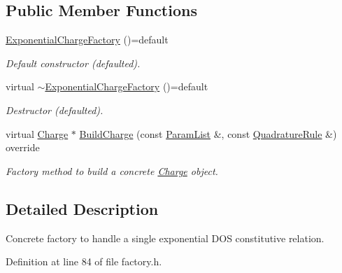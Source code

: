 \subsection*{Public Member Functions}
\begin{DoxyCompactItemize}
\item 
\hypertarget{classExponentialChargeFactory_a857af7212bef3bc0691b90f82160ede0}{\hyperlink{classExponentialChargeFactory_a857af7212bef3bc0691b90f82160ede0}{Exponential\-Charge\-Factory} ()=default}\label{classExponentialChargeFactory_a857af7212bef3bc0691b90f82160ede0}

\begin{DoxyCompactList}\small\item\em Default constructor (defaulted). \end{DoxyCompactList}\item 
\hypertarget{classExponentialChargeFactory_a27be0c4dbe004a49db0065cd9e26bb04}{virtual \hyperlink{classExponentialChargeFactory_a27be0c4dbe004a49db0065cd9e26bb04}{$\sim$\-Exponential\-Charge\-Factory} ()=default}\label{classExponentialChargeFactory_a27be0c4dbe004a49db0065cd9e26bb04}

\begin{DoxyCompactList}\small\item\em Destructor (defaulted). \end{DoxyCompactList}\item 
virtual \hyperlink{classCharge}{Charge} $\ast$ \hyperlink{classExponentialChargeFactory_a1e1718ca16c1624e98865bc6359c2136}{Build\-Charge} (const \hyperlink{classParamList}{Param\-List} \&, const \hyperlink{classQuadratureRule}{Quadrature\-Rule} \&) override
\begin{DoxyCompactList}\small\item\em Factory method to build a concrete \hyperlink{classCharge}{Charge} object. \end{DoxyCompactList}\end{DoxyCompactItemize}


\subsection{Detailed Description}
Concrete factory to handle a single exponential D\-O\-S constitutive relation. 

Definition at line 84 of file factory.\-h.




